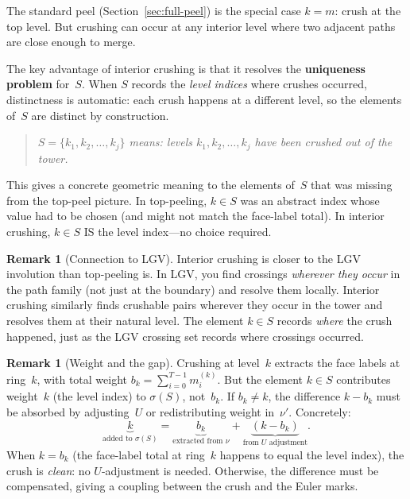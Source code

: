 \documentclass[11pt]{article}
\theoremstyle{plain}
\theoremstyle{definition}
\newtheorem{remark}[theorem]{Remark}
\begin{document}
\noindent
The standard peel (Section~\ref{sec:full-peel}) is the special
case $k = m$: crush at the top level.  But crushing can occur
at any interior level where two adjacent paths are close enough
to merge.

The key advantage of interior crushing is that it resolves the
\textbf{uniqueness problem} for~$S$.  When $S$ records the
\emph{level indices} where crushes occurred, distinctness is
automatic: each crush happens at a different level, so the
elements of~$S$ are distinct by construction.

\begin{quote}
\emph{$S = \{k_1, k_2, \ldots, k_j\}$ means: levels $k_1, k_2,
\ldots, k_j$ have been crushed out of the tower.}
\end{quote}

\noindent
This gives a concrete geometric meaning to the elements of~$S$
that was missing from the top-peel picture.  In top-peeling,
$k \in S$ was an abstract index whose value had to be chosen
(and might not match the face-label total).  In interior
crushing, $k \in S$ IS the level index---no choice required.

\begin{remark}[Connection to LGV]
\label{rmk:crushing-lgv}
Interior crushing is closer to the LGV involution than
top-peeling is.  In LGV, you find crossings \emph{wherever they
occur} in the path family (not just at the boundary) and resolve
them locally.  Interior crushing similarly finds crushable pairs
wherever they occur in the tower and resolves them at their
natural level.  The element $k \in S$ records \emph{where} the
crush happened, just as the LGV crossing set records where
crossings occurred.
\end{remark}

\begin{remark}[Weight and the gap]
\label{rmk:crush-weight}
Crushing at level~$k$ extracts the face labels at ring~$k$,
with total weight $b_k = \sum_{i=0}^{T-1} m_i^{(k)}$.  But the
element $k \in S$ contributes weight~$k$ (the level index) to
$\sigma(S)$, not~$b_k$.  If $b_k \neq k$, the difference
$k - b_k$ must be absorbed by adjusting~$U$ or redistributing
weight in~$\nu'$.  Concretely:
\[
  \underbrace{k}_{\text{added to } \sigma(S)}
  = \underbrace{b_k}_{\text{extracted from } \nu}
  + \underbrace{(k - b_k)}_{\text{from } U \text{ adjustment}}.
\]
When $k = b_k$ (the face-label total at ring~$k$ happens to
equal the level index), the crush is \emph{clean}: no
$U$-adjustment is needed.  Otherwise, the difference must be
compensated, giving a coupling between the crush and the Euler
marks.
\end{remark}
\end{document}
